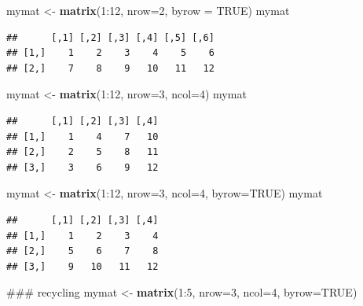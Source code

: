 \documentclass[]{book}
\newenvironment{Shaded}{\begin{snugshade}}{\end{snugshade}}
\newcommand{\KeywordTok}[1]{\textcolor[rgb]{0.13,0.29,0.53}{\textbf{{#1}}}}
\newcommand{\DataTypeTok}[1]{\textcolor[rgb]{0.13,0.29,0.53}{{#1}}}
\newcommand{\DecValTok}[1]{\textcolor[rgb]{0.00,0.00,0.81}{{#1}}}
\newcommand{\StringTok}[1]{\textcolor[rgb]{0.31,0.60,0.02}{{#1}}}
\newcommand{\OtherTok}[1]{\textcolor[rgb]{0.56,0.35,0.01}{{#1}}}
\newcommand{\NormalTok}[1]{{#1}}
\begin{document}
\begin{Shaded}
\begin{Highlighting}[]
\NormalTok{mymat <-}\StringTok{ }\KeywordTok{matrix}\NormalTok{(}\DecValTok{1}\NormalTok{:}\DecValTok{12}\NormalTok{, }\DataTypeTok{nrow=}\DecValTok{2}\NormalTok{, }\DataTypeTok{byrow =} \OtherTok{TRUE}\NormalTok{)}
\NormalTok{mymat}
\end{Highlighting}
\end{Shaded}

\begin{verbatim}
##      [,1] [,2] [,3] [,4] [,5] [,6]
## [1,]    1    2    3    4    5    6
## [2,]    7    8    9   10   11   12
\end{verbatim}

\begin{Shaded}
\begin{Highlighting}[]
\NormalTok{mymat <-}\StringTok{ }\KeywordTok{matrix}\NormalTok{(}\DecValTok{1}\NormalTok{:}\DecValTok{12}\NormalTok{, }\DataTypeTok{nrow=}\DecValTok{3}\NormalTok{, }\DataTypeTok{ncol=}\DecValTok{4}\NormalTok{)}
\NormalTok{mymat}
\end{Highlighting}
\end{Shaded}

\begin{verbatim}
##      [,1] [,2] [,3] [,4]
## [1,]    1    4    7   10
## [2,]    2    5    8   11
## [3,]    3    6    9   12
\end{verbatim}

\begin{Shaded}
\begin{Highlighting}[]
\NormalTok{mymat <-}\StringTok{ }\KeywordTok{matrix}\NormalTok{(}\DecValTok{1}\NormalTok{:}\DecValTok{12}\NormalTok{, }\DataTypeTok{nrow=}\DecValTok{3}\NormalTok{, }\DataTypeTok{ncol=}\DecValTok{4}\NormalTok{, }\DataTypeTok{byrow=}\OtherTok{TRUE}\NormalTok{)}
\NormalTok{mymat}
\end{Highlighting}
\end{Shaded}

\begin{verbatim}
##      [,1] [,2] [,3] [,4]
## [1,]    1    2    3    4
## [2,]    5    6    7    8
## [3,]    9   10   11   12
\end{verbatim}

\begin{Shaded}
\begin{Highlighting}[]
\NormalTok{### recycling}
\NormalTok{mymat <-}\StringTok{ }\KeywordTok{matrix}\NormalTok{(}\DecValTok{1}\NormalTok{:}\DecValTok{5}\NormalTok{, }\DataTypeTok{nrow=}\DecValTok{3}\NormalTok{, }\DataTypeTok{ncol=}\DecValTok{4}\NormalTok{, }\DataTypeTok{byrow=}\OtherTok{TRUE}\NormalTok{)}
\end{Highlighting}
\end{Shaded}
\end{document}
